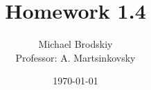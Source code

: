 


\title{Homework 1.4}
\date{\today}
\author{Michael Brodskiy\\ \small Professor: A. Martsinkovsky}



\maketitle

